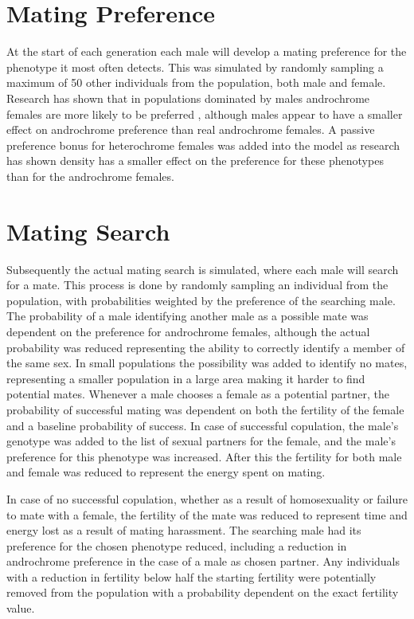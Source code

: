 \documentclass{article}
\begin{document}
\section{Mating Preference}
At the start of each generation each male will develop a mating preference for the phenotype it most often detects. This was simulated by randomly sampling a maximum of 50 other individuals from the population, both male and female. Research has shown that in populations dominated by males androchrome females are more likely to be preferred \cite{}, although males appear to have a smaller effect on androchrome preference than real androchrome females. A passive preference bonus for heterochrome females was added into the model as research has shown density has a smaller effect on the preference for these phenotypes than for the androchrome females.

\section{Mating Search}
Subsequently the actual mating search is simulated, where each male will search for a mate. This process is done by randomly sampling an individual from the population, with probabilities weighted by the preference of the searching male. The probability of a male identifying another male as a possible mate was dependent on the preference for androchrome females, although the actual probability was reduced representing the ability to correctly identify a member of the same sex. In small populations the possibility was added to identify no mates, representing a smaller population in a large area making it harder to find potential mates. Whenever a male chooses a female as a potential partner, the probability of successful mating was dependent on both the fertility of the female and a baseline probability of success. In case of successful copulation, the male's genotype was added to the list of sexual partners for the female, and the male's preference for this phenotype was increased. After this the fertility for both male and female was reduced to represent the energy spent on mating.

In case of no successful copulation, whether as a result of homosexuality or failure to mate with a female, the fertility of the mate was reduced to represent time and energy lost as a result of mating harassment. The searching male had its preference for the chosen phenotype reduced, including a reduction in androchrome preference in the case of a male as chosen partner. Any individuals with a reduction in fertility below half the starting fertility were potentially removed from the population with a probability dependent on the exact fertility value.
\end{document}
